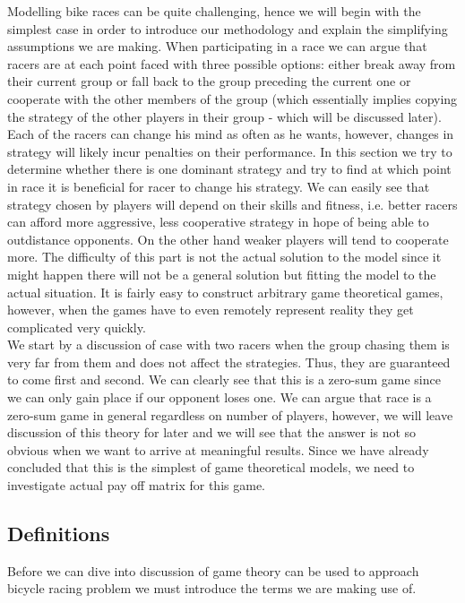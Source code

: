 \documentclass[10pt, a4paper]{report}
\begin{document}
Modelling bike races can be quite challenging, hence we will begin with the simplest case in order to introduce our methodology and explain the simplifying assumptions we are making. When participating in a race we can argue that racers are at each point faced with three possible options: either break away from their current group or fall back to the group preceding the current one or cooperate with the other members of the group (which essentially implies copying the strategy of the other players in their group - which will be discussed later). Each of the racers can change his mind as often as he wants, however, changes in strategy will likely incur penalties on their performance. In this section we try to determine whether there is one dominant strategy and try to find at which point in race it is beneficial for racer to change his strategy. We can easily see that strategy chosen by players will depend on their skills and fitness, i.e. better racers can afford more aggressive, less cooperative strategy in hope of being able to outdistance opponents. On the other hand weaker players will tend to cooperate more. The difficulty of this part is not the actual solution to the model since it might happen there will not be a general solution but fitting the model to the actual situation. It is fairly easy to construct arbitrary game theoretical games, however, when the games have to even remotely represent reality they get complicated very quickly.\\

We start by a discussion of case with two racers when the group chasing them is very far from them and does not affect the strategies. Thus, they are guaranteed to come first and second. We can clearly see that this is a zero-sum game since we can only gain place if our opponent loses one. We can argue that race is a zero-sum game in general regardless on number of players, however, we will leave discussion of this theory for later and we will see that the answer is not so obvious when we want to arrive at meaningful results. Since we have already concluded that this is the simplest of game theoretical models, we need to investigate actual pay off matrix for this game.


\subsection{Definitions}\label{subsec:defs}

Before we can dive into discussion of game theory can be used to approach bicycle racing problem we must introduce the terms we are making use of.
\end{document}

